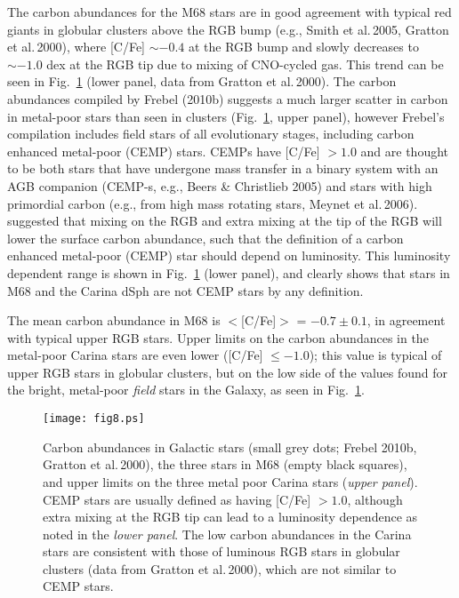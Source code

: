\documentclass{emulateapj}
\newcommand\etal{{\rm et al.\,}}
\begin{document}
The carbon abundances for the M68 stars are in good agreement
with typical red giants in globular clusters above the RGB bump
(e.g., Smith \etal  2005, Gratton \etal 2000), 
where [C/Fe] $\sim -0.4$ at the RGB bump and slowly decreases 
to $\sim -1.0$ dex at the RGB tip due to mixing of CNO-cycled 
gas.  This trend can be seen in Fig.~\ref{carbon} (lower panel,
data from Gratton \etal 2000). 
The carbon abundances compiled by Frebel (2010b) suggests 
a much larger scatter in carbon in metal-poor stars than
seen in clusters (Fig.~\ref{carbon}, upper panel), however 
Frebel's compilation includes field stars of all evolutionary
stages, including carbon enhanced metal-poor (CEMP) stars. 
CEMPs have [C/Fe] $> 1.0$ and are thought to be both stars 
that have undergone mass transfer in a binary system with 
an AGB companion (CEMP-s, e.g., Beers \& Christlieb 2005) 
and stars with high primordial carbon 
(e.g., from high mass rotating stars, Meynet \etal  2006).
%
\citet{Aoki07} suggested that mixing on the RGB 
and extra mixing at the tip of the RGB will lower the surface 
carbon abundance, such that the definition of a carbon 
enhanced metal-poor (CEMP) star should depend on luminosity.
This luminosity dependent range is shown in Fig.~\ref{carbon}
(lower panel), and clearly shows that stars in M68 and the 
Carina dSph are not CEMP stars by any definition.
 
The mean carbon abundance in M68 is $<$[C/Fe]$>$ = $-0.7 \pm 0.1$, 
in agreement with typical upper RGB stars.  Upper limits on 
the carbon abundances in the metal-poor Carina stars 
are even lower ([C/Fe] $\le -1.0$); this value is typical 
of upper RGB stars in globular clusters, but on the 
low side of the values found for the bright, metal-poor 
{\it field} stars in the Galaxy, as seen in Fig.~\ref{carbon}.


\begin{figure}[t]
\texttt{[image: fig8.ps]}
\caption{Carbon abundances in Galactic stars (small grey 
dots; Frebel 2010b, Gratton \etal  2000), the three stars in
M68 (empty black squares), and upper limits on the three metal 
poor Carina stars ({\it upper panel}). 
CEMP stars are usually defined as having [C/Fe] $> 1.0$, although
extra mixing at the RGB tip can lead to a luminosity dependence
as noted in the {\it lower panel}.   The low carbon abundances in
the Carina stars are consistent with those of luminous RGB stars 
in globular clusters (data from Gratton \etal 2000), which are not
similar to CEMP stars.   
}
\label{carbon}
\end{figure}
\end{document}
